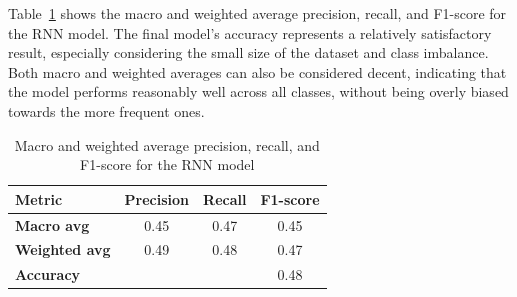 Table~\ref{tab:macro_weighted_avg} shows the macro and weighted average precision,
recall, and F1-score for the RNN model.
The final model's accuracy represents a relatively satisfactory result,
especially considering the small size of the dataset and
class imbalance.
Both macro and weighted averages can also be considered decent,
indicating that the model performs reasonably well across all classes,
without being overly biased towards the more frequent ones.

\begin{table}[H]
    \centering
    \begin{tabular}{lccc}
        \toprule
        \textbf{Metric} & \textbf{Precision} & \textbf{Recall} & \textbf{F1-score} \\
        \midrule
        \textbf{Macro avg}    & 0.45 & 0.47 & 0.45 \\
        \textbf{Weighted avg} & 0.49 & 0.48 & 0.47 \\
        \midrule
        \textbf{Accuracy}     & & & 0.48 \\
        \bottomrule
    \end{tabular}
    \caption{Macro and weighted average precision, recall, and F1-score for the RNN model}
    \label{tab:macro_weighted_avg}
\end{table}